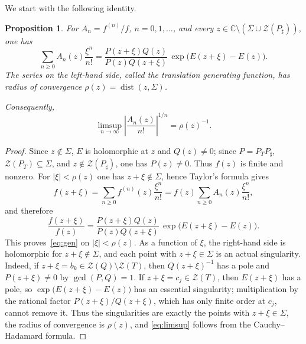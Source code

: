 \documentclass[reqno]{article}
\newtheorem{prop}[theorem]{Proposition}
\theoremstyle{definition}
\theoremstyle{remark}
\theoremstyle{plain}
\newcommand{\C}{\mathbb C}
\newcommand{\Z}{\mathcal Z}
\begin{document}
We start with the following identity.

\begin{prop}\label{prop:gen}
For $A_n=f^{(n)}/f$, $n=0,1,\dots$, and every $z\in\C\setminus(\Sigma\cup \Z(P_\sharp))$, one has
\begin{equation}\label{eq:gen}
\sum_{n\ge0}A_n(z)\frac{\xi^n}{n!}=\frac{P(z+\xi)Q(z)}{P(z)Q(z+\xi)}\,\exp\!\bigl(E(z+\xi)-E(z)\bigr).
\end{equation}
The series on the left-hand side, called the \emph{translation generating function}, has radius of convergence $\rho(z)=\operatorname{dist}(z,\Sigma)$.

 Consequently,
\begin{equation}\label{eq:limsup}
\limsup_{n\to\infty}\left|\frac{A_n(z)}{n!}\right|^{1/n}=\rho(z)^{-1}.
\end{equation}
\end{prop}

\begin{proof}
Since $z\notin\Sigma$, $E$ is holomorphic at $z$ and $Q(z)\ne0$; since $P=P_TP_\sharp$, $\Z(P_T)\subseteq\Sigma$, and $z\notin\Z(P_\sharp)$, one has $P(z)\ne0$. Thus $f(z)$ is finite and nonzero. For $|\xi|<\rho(z)$ one has $z+\xi\notin\Sigma$, hence Taylor's formula gives
$$f(z+\xi)=\sum_{n\ge0}f^{(n)}(z)\frac{\xi^n}{n!}=f(z)\sum_{n\ge0}A_n(z)\frac{\xi^n}{n!},$$
and therefore
$$\frac{f(z+\xi)}{f(z)}=\frac{P(z+\xi)Q(z)}{P(z)Q(z+\xi)}\,\exp\!\bigl(E(z+\xi)-E(z)\bigr).$$
This proves~\eqref{eq:gen} on $|\xi|<\rho(z)$. As a function of $\xi$, the right-hand side is holomorphic for $z+\xi\notin\Sigma$, and each point with $z+\xi\in\Sigma$ is an actual singularity. Indeed, if $z+\xi=b_k\in \Z(Q)\setminus \Z(T)$, then $Q(z+\xi)^{-1}$ has a pole and $P(z+\xi)\ne0$ by $\gcd(P,Q)=1$. If $z+\xi=c_j\in \Z(T)$, then $E(z+\xi)$ has a pole, so $\exp\!\bigl(E(z+\xi)-E(z)\bigr)$ has an essential singularity; multiplication by the rational factor $P(z+\xi)/Q(z+\xi)$, which has only finite order at $c_j$, cannot remove it. Thus the singularities are exactly the points with $z+\xi\in\Sigma$, the radius of convergence is $\rho(z)$, and \eqref{eq:limsup} follows from the Cauchy--Hadamard formula.
\end{proof}
\end{document}
